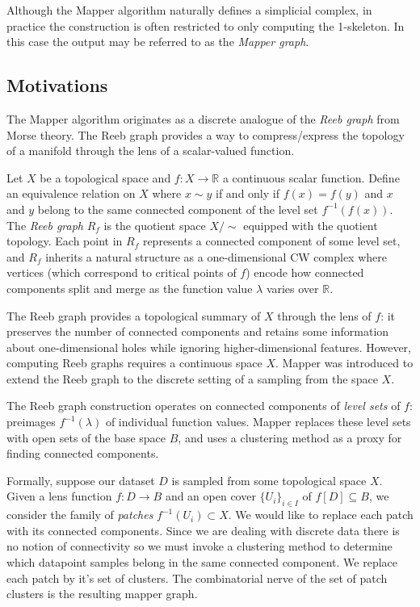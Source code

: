 \begin{remark}
  Although the Mapper algorithm naturally defines a simplicial complex, 
  in practice the construction is often restricted to only computing the 
  1-skeleton. In this case the output may be referred to as the \emph{Mapper graph}.
\end{remark}

\subsection{Motivations}

The Mapper algorithm originates as a discrete analogue of the \emph{Reeb graph} 
from Morse theory. The Reeb graph provides a way to compress/express the topology 
of a manifold through the lens of a scalar-valued function.

\begin{definition}
Let $X$ be a topological space and $f : X \to \mathbb{R}$ a continuous scalar function. 
Define an equivalence relation on $X$ where $x \sim y$ if and only if 
$f(x) = f(y)$ and $x$ and $y$ belong to the same connected component of the 
level set $f^{-1}(f(x))$. The \emph{Reeb graph} $R_f$ is the quotient space 
$X / \!\sim$ equipped with the quotient topology. Each point in $R_f$ represents 
a connected component of some level set, and $R_f$ inherits a natural structure 
as a one-dimensional CW complex where vertices (which correspond to critical points of $f$) 
encode how connected components split and merge as the function value 
$\lambda$ varies over $\mathbb{R}$.
\end{definition}

The Reeb graph provides a topological summary of $X$ through the lens of $f$: 
it preserves the number of connected components and retains some information 
about one-dimensional holes while ignoring higher-dimensional features. However, 
computing Reeb graphs requires a continuous space $X$. Mapper was introduced 
to extend the Reeb graph to the discrete setting of a sampling from the space $X$.

The Reeb graph construction operates on connected components of 
\emph{level sets} of $f$: preimages $f^{-1}(\lambda)$ of individual function 
values. Mapper replaces these level sets with open sets of the base space $B$,
and uses a clustering method as a proxy for finding connected components.

Formally, suppose our dataset $D$ is sampled from some topological space $X$. 
Given a lens function $f: D \rightarrow B$ and an open cover 
$\{ U_i \}_{i \in I}$ of $f[D] \subseteq B$, we consider the family of \emph{patches}
$f^{-1}(U_i) \subset X$. We would like to replace each patch with its 
connected components. Since we are dealing with discrete data there 
is no notion of connectivity so we must invoke a clustering method 
to determine which datapoint samples belong in the same connected component. 
We replace each patch by it's set of clusters. The combinatorial 
nerve of the set of patch clusters is the resulting mapper graph.

